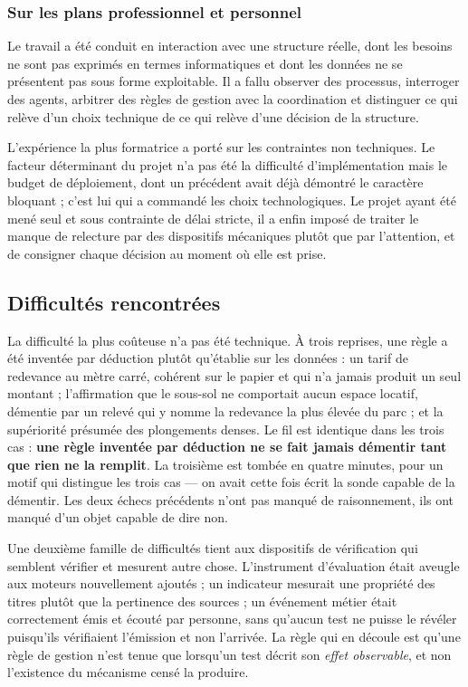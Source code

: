 \subsubsection{Sur les plans professionnel et personnel}

Le travail a été conduit en interaction avec une structure réelle, dont les besoins ne sont pas exprimés en termes informatiques et dont les données ne se présentent pas sous forme exploitable. Il a fallu observer des processus, interroger des agents, arbitrer des règles de gestion avec la coordination et distinguer ce qui relève d'un choix technique de ce qui relève d'une décision de la structure.

L'expérience la plus formatrice a porté sur les contraintes non techniques. Le facteur déterminant du projet n'a pas été la difficulté d'implémentation mais le budget de déploiement, dont un précédent avait déjà démontré le caractère bloquant ; c'est lui qui a commandé les choix technologiques. Le projet ayant été mené seul et sous contrainte de délai stricte, il a enfin imposé de traiter le manque de relecture par des dispositifs mécaniques plutôt que par l'attention, et de consigner chaque décision au moment où elle est prise.

\subsection{Difficultés rencontrées}

La difficulté la plus coûteuse n'a pas été technique. À trois reprises, une règle a été inventée par déduction plutôt qu'établie sur les données : un tarif de redevance au mètre carré, cohérent sur le papier et qui n'a jamais produit un seul montant ; l'affirmation que le sous-sol ne comportait aucun espace locatif, démentie par un relevé qui y nomme la redevance la plus élevée du parc ; et la supériorité présumée des plongements denses. Le fil est identique dans les trois cas : \textbf{une règle inventée par déduction ne se fait jamais démentir tant que rien ne la remplit}. La troisième est tombée en quatre minutes, pour un motif qui distingue les trois cas --- on avait cette fois écrit la sonde capable de la démentir. Les deux échecs précédents n'ont pas manqué de raisonnement, ils ont manqué d'un objet capable de dire non.

Une deuxième famille de difficultés tient aux dispositifs de vérification qui semblent vérifier et mesurent autre chose. L'instrument d'évaluation était aveugle aux moteurs nouvellement ajoutés ; un indicateur mesurait une propriété des titres plutôt que la pertinence des sources ; un événement métier était correctement émis et écouté par personne, sans qu'aucun test ne puisse le révéler puisqu'ils vérifiaient l'émission et non l'arrivée. La règle qui en découle est qu'une règle de gestion n'est tenue que lorsqu'un test décrit son \emph{effet observable}, et non l'existence du mécanisme censé la produire.

